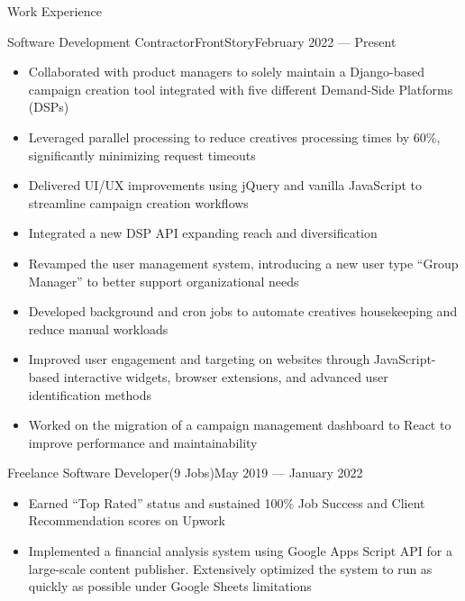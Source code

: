 \documentclass[]{mcdowellcv}
\begin{document}
	\makeheader
	
	
	\begin{cvsection}{Work Experience}
		\begin{cvsubsection}{Software Development Contractor}{FrontStory}{February 2022 — Present}
			\begin{itemize}
				\item Collaborated with product managers to solely maintain a Django-based campaign creation tool integrated with five different Demand-Side Platforms (DSPs)
				\item Leveraged parallel processing to reduce creatives processing times by 60\%, significantly minimizing request timeouts
				\item Delivered UI/UX improvements using jQuery and vanilla JavaScript to streamline campaign creation workflows
				\item Integrated a new DSP API expanding reach and diversification
				\item Revamped the user management system, introducing a new user type “Group Manager” to better support organizational needs
				\item Developed background and cron jobs to automate creatives housekeeping and reduce manual workloads
				\item Improved user engagement and targeting on websites through JavaScript-based interactive widgets, browser extensions, and advanced user identification methods
				\item Worked on the migration of a campaign management dashboard to React to improve performance and maintainability
			\end{itemize}
		\end{cvsubsection}
		\begin{cvsubsection}{Freelance Software Developer}{(9 Jobs)}{May 2019 — January 2022}
			\begin{itemize}
				\item Earned “Top Rated” status and sustained 100\% Job Success and Client Recommendation scores on Upwork
				\item Implemented a financial analysis system using Google Apps Script API for a large-scale content publisher. Extensively optimized the system to run as quickly as possible under Google Sheets limitations
			\end{itemize}
		\end{cvsubsection}
	\end{cvsection}
	
\end{document}
